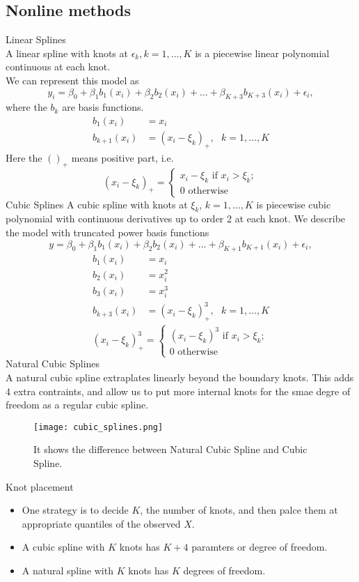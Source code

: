 \documentclass[11pt, a4paper]{article}
\begin{document}
\subsection{Nonline methods}
Linear Splines\\
A linear spline with knots at $\epsilon_k, k=1,\dots,K$ is a piecewise linear polynomial continuous at each knot.\\
We can represent this model as
\[
  y_i=\beta_0+\beta_1b_1(x_i)+\beta_2b_2(x_i)+\dots+\beta_{K+3}b_{K+3}(x_i)+\epsilon_i,
\]
where the $b_k$ are basis functions.
\begin{align}
  b_1(x_i)&=x_i\\
  b_{k+1}(x_i)&=(x_i-\xi_k)_+, \text{    }k=1,\dots,K
  \end{align}
  Here the $()_+$ means positive part, i.e.
  \[
    (x_i-\xi_k)_+=
    \begin{cases}x_i-\xi_k \text{ if }x_i>\xi_k;\\
      0\text{  otherwise}
    \end{cases}
  \]
  Cubic Splines
  A cubic spline with knots at $\xi_k$, $k=1,\dots,K$ is piecewise cubic polynomial with continuous derivatives up to order 2 at each knot.
  We describe the model with truncated power basis functions
  \[
    y=\beta_0+\beta_1b_1(x_i)+\beta_2b_2(x_i)+\dots+\beta_{K+1}b_{K+1}(x_i)+\epsilon_i,
  \]
\begin{align}
  b_1(x_i)&=x_i\\
  b_2(x_i)&=x_i^2\\
  b_3(x_i)&=x_i^3\\
  b_{k+3}(x_i)&=(x_i-\xi_k)^3_+, \text{    }k=1,\dots,K
  \end{align}
  \[
    (x_i-\xi_k)^3_+=
    \begin{cases}(x_i-\xi_k)^3 \text{ if }x_i>\xi_k;\\
      0\text{  otherwise}
    \end{cases}
  \]
Natural Cubic Splines\\[1mm]
A natural cubic spline extraplates linearly beyond the boundary knots. This adds 4 extra contraints, and allow us to put more internal knots for the smae degre of freedom as a regular cubic spline.
\begin{figure}
[h!]
\centering
\texttt{[image: cubic\_splines.png]}
\caption{It shows the difference between Natural Cubic Spline and Cubic Spline.}
\end{figure}
Knot placement
\begin{itemize}
\item One strategy is to decide $K$, the number of knots, and then palce them at appropriate quantiles of the observed $X$.
\item A cubic spline with $K$ knots has $K+4$ paramters or degree of freedom.
\item A natural spline with $K$ knots has $K$ degrees of freedom.
\end{itemize}
\end{document}
